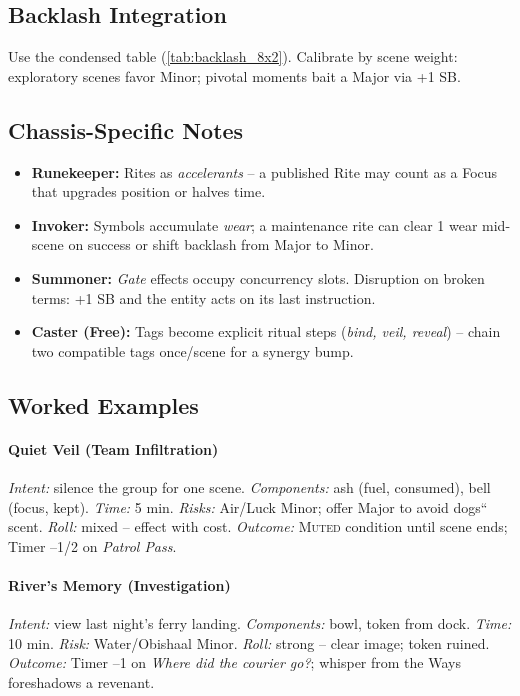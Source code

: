 \subsection{Backlash Integration}\label{subsec:ritual_backlash}
Use the condensed table (\autoref{tab:backlash_8x2}). Calibrate by scene weight: exploratory scenes favor Minor; pivotal moments bait a Major via +1 SB.

\subsection{Chassis-Specific Notes}\label{subsec:ritual_chassis}
\begin{itemize}
    \item \textbf{Runekeeper:} Rites as \emph{accelerants} -- a published Rite may count as a Focus that upgrades position or halves time.
    \item \textbf{Invoker:} Symbols accumulate \emph{wear}; a maintenance rite can clear 1 wear mid-scene on success or shift backlash from Major to Minor.
    \item \textbf{Summoner:} \emph{Gate} effects occupy concurrency slots. Disruption on broken terms: +1 SB and the entity acts on its last instruction.
    \item \textbf{Caster (Free):} Tags become explicit ritual steps (\emph{bind, veil, reveal}) -- chain two compatible tags once/scene for a synergy bump.
\end{itemize}

\subsection{Worked Examples}\label{subsec:ritual_examples}
\paragraph{Quiet Veil (Team Infiltration)} \emph{Intent:} silence the group for one scene. \emph{Components:} ash (fuel, consumed), bell (focus, kept). \emph{Time:} 5 min. \emph{Risks:} Air/Luck Minor; offer Major to avoid dogs`` scent. \emph{Roll:} mixed -- effect with cost. \emph{Outcome:} \textsc{Muted} condition until scene ends; Timer --1/2 on \emph{Patrol Pass}.

\paragraph{River's Memory (Investigation)} \emph{Intent:} view last night's ferry landing. \emph{Components:} bowl, token from dock. \emph{Time:} 10 min. \emph{Risk:} Water/Obishaal Minor. \emph{Roll:} strong -- clear image; token ruined. \emph{Outcome:} Timer --1 on \emph{Where did the courier go?}; whisper from the Ways foreshadows a revenant.

